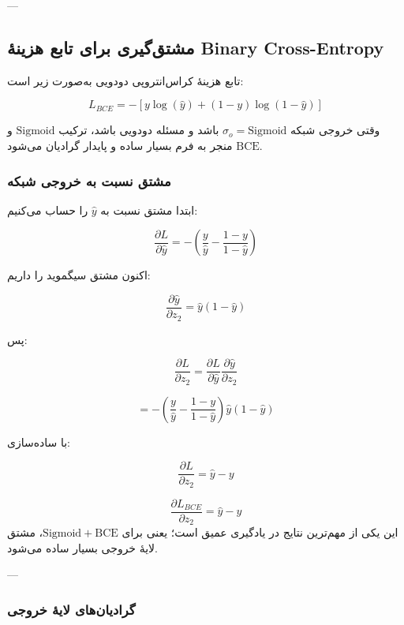 \documentclass[12pt,a4paper]{article}
\begin{document}
---

\subsection{مشتق‌گیری برای تابع هزینهٔ Binary Cross-Entropy}

تابع هزینهٔ کراس‌انتروپی دودویی به‌صورت زیر است:

\[
L_{BCE}=-\left[y\log(\hat{y})+(1-y)\log(1-\hat{y})\right]
\]

\begin{tcolorbox}[colback=softgreen,colframe=mygreen,title=مزیت مهم BCE]
	وقتی خروجی شبکه \(\sigma_o=\mathrm{Sigmoid}\) باشد و مسئله دودویی باشد، ترکیب \(\mathrm{Sigmoid}\) و \(\mathrm{BCE}\) منجر به فرم بسیار ساده و پایدار گرادیان می‌شود.
\end{tcolorbox}

\subsubsection{مشتق نسبت به خروجی شبکه}

ابتدا مشتق نسبت به \(\hat{y}\) را حساب می‌کنیم:

\[
\frac{\partial L}{\partial \hat{y}}
=
-\left(\frac{y}{\hat{y}}-\frac{1-y}{1-\hat{y}}\right)
\]

اکنون مشتق سیگموید را داریم:

\[
\frac{\partial \hat{y}}{\partial z_2}
=
\hat{y}(1-\hat{y})
\]

پس:

\[
\frac{\partial L}{\partial z_2}
=
\frac{\partial L}{\partial \hat{y}}
\frac{\partial \hat{y}}{\partial z_2}
\]

\[
=
-\left(\frac{y}{\hat{y}}-\frac{1-y}{1-\hat{y}}\right)\hat{y}(1-\hat{y})
\]

با ساده‌سازی:

\[
\frac{\partial L}{\partial z_2}
=
\hat{y}-y
\]

\begin{tcolorbox}[colback=softorange,colframe=golden,title=نتیجهٔ بسیار مهم]
	\[
	\boxed{
		\frac{\partial L_{BCE}}{\partial z_2}=\hat{y}-y
	}
	\]
	این یکی از مهم‌ترین نتایج در یادگیری عمیق است؛ یعنی برای \(\mathrm{Sigmoid}+\mathrm{BCE}\)، مشتق لایهٔ خروجی بسیار ساده می‌شود.
\end{tcolorbox}

---

\subsubsection{گرادیان‌های لایهٔ خروجی}
\end{document}
